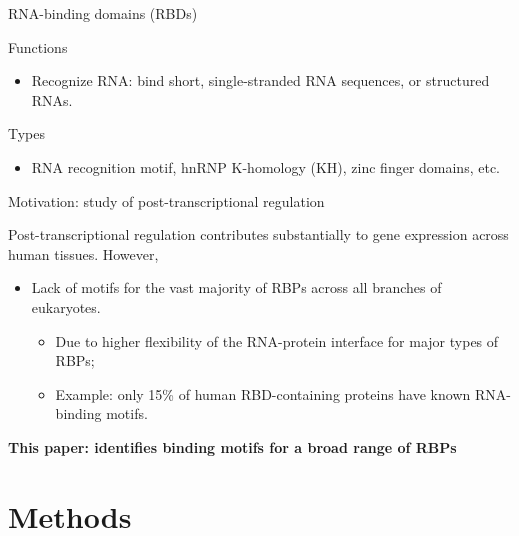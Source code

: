\documentclass[professionalfont, 12pt, default]{beamer}
\providecommand{\tightlist}{%
    \setlength{\itemsep}{0pt}\setlength{\parskip}{0pt}}
\begin{document}
\begin{frame}{RNA-binding domains (RBDs)}

\begin{block}{Functions}

\begin{itemize}
\tightlist
\item
  Recognize RNA: bind short, single-stranded RNA sequences, or
  structured RNAs.
\end{itemize}

\end{block}

\begin{block}{Types}

\begin{itemize}
\tightlist
\item
  RNA recognition motif, hnRNP K-homology (KH), zinc finger domains,
  etc.
\end{itemize}

\end{block}

\end{frame}

\begin{frame}{Motivation: study of post-transcriptional regulation}

Post-transcriptional regulation contributes substantially to gene
expression across human tissues. However,

\begin{itemize}
\tightlist
\item
  Lack of motifs for the vast majority of RBPs across all branches of
  eukaryotes.

  \begin{itemize}
  \tightlist
  \item
    Due to higher flexibility of the RNA-protein interface for major
    types of RBPs;
  \item
    Example: only 15\% of human RBD-containing proteins have known
    RNA-binding motifs.
  \end{itemize}
\end{itemize}

\textbf{This paper: identifies binding motifs for a broad range of RBPs}

\end{frame}

\section{Methods}\label{methods}
\end{document}
